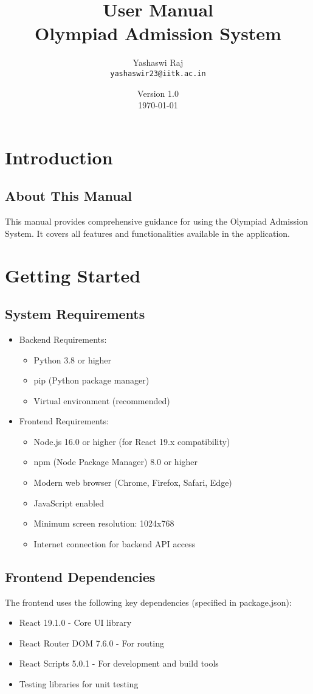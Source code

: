 \documentclass[12pt,a4paper]{article}
\title{User Manual\\
       Olympiad Admission System}
\author{Yashaswi Raj\\\texttt{yashaswir23@iitk.ac.in}}
\date{\normalsize Version 1.0 \\ \today}
\begin{document}
\maketitle
\tableofcontents
\newpage

\section{Introduction}
\subsection{About This Manual}
This manual provides comprehensive guidance for using the Olympiad Admission System. It covers all features and functionalities available in the application.

\section{Getting Started}
\subsection{System Requirements}
\begin{itemize}
    \item Backend Requirements:
    \begin{itemize}
        \item Python 3.8 or higher
        \item pip (Python package manager)
        \item Virtual environment (recommended)
    \end{itemize}
    \item Frontend Requirements:
    \begin{itemize}
        \item Node.js 16.0 or higher (for React 19.x compatibility)
        \item npm (Node Package Manager) 8.0 or higher
        \item Modern web browser (Chrome, Firefox, Safari, Edge)
        \item JavaScript enabled
        \item Minimum screen resolution: 1024x768
        \item Internet connection for backend API access
    \end{itemize}
\end{itemize}

\subsection{Frontend Dependencies}
The frontend uses the following key dependencies (specified in package.json):
\begin{itemize}
    \item React 19.1.0 - Core UI library
    \item React Router DOM 7.6.0 - For routing
    \item React Scripts 5.0.1 - For development and build tools
    \item Testing libraries for unit testing
\end{itemize}
\end{document}
